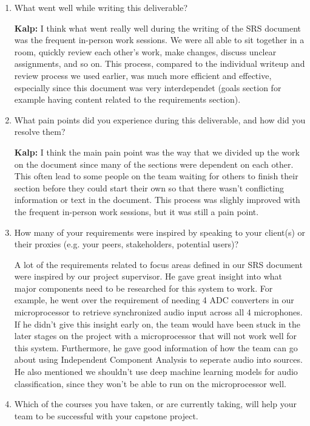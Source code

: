 \begin{enumerate}
  \item What went well while writing this deliverable? 

  \textbf{Kalp:} I think what went really well during the writing of the SRS
  document was the frequent in-person work sessions. We were all able to sit 
  together in a room, quickly review each other's work, make changes, discuss 
  unclear assignments, and so on. This process, compared to the individual 
  writeup and review process we used earlier, was much more efficient and 
  effective, especially since this document was very interdependet (goals
  section for example having content related to the requirements section).

  \item What pain points did you experience during this deliverable, and how did
  you resolve them?

  \textbf{Kalp:} I think the main pain point was the way that we divided up the 
  work on the document since many of the sections were dependent on each other.
  This often lead to some people on the team waiting for others to finish their
  section before they could start their own so that there wasn't conflicting
  information or text in the document. This process was slighly improved with 
  the frequent in-person work sessions, but it was still a pain point.

  \item How many of your requirements were inspired by speaking to your
  client(s) or their proxies (e.g. your peers, stakeholders, potential users)?

  A lot of the requirements related to focus areas defined in our SRS document 
  were inspired by our project supervisor. He gave great insight into what major
  components need to be researched for this system to work. For example, he went 
  over the requirement of needing 4 ADC converters in our microprocessor to 
  retrieve synchronized audio input across all 4 microphones. If he didn't give 
  this insight early on, the team would have been stuck in the later stages on 
  the project with a microprocessor that will not work well for this system. 
  Furthermore, he gave good information of how the team can go about using 
  Independent Component Analysis to seperate audio into sources. He also 
  mentioned we shouldn't use deep machine learning models for audio 
  classification, since they won't be able to run on the microprocessor well. 

  
  \item Which of the courses you have taken, or are currently taking, will help
  your team to be successful with your capstone project.


\end{enumerate}
